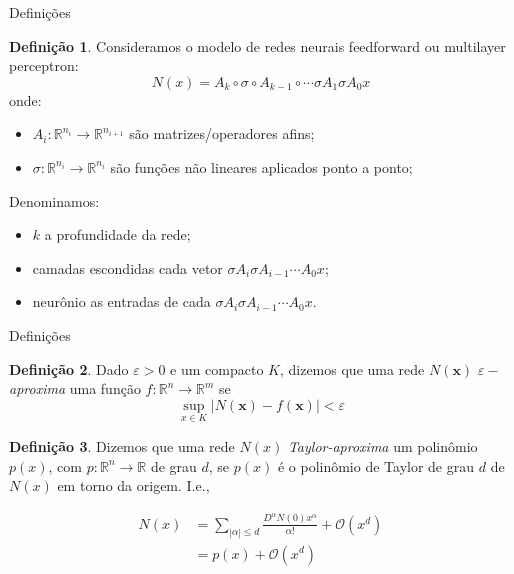 \documentclass{beamer}
\theoremstyle{definition}
\newtheorem{defin}{Definição}[section]
\begin{document}
\begin{frame}{Definições}
    \small

    \begin{defin}
        Consideramos o modelo de redes neurais feedforward ou multilayer perceptron:
        \begin{equation}
            N(x) = A_k \circ \sigma \circ A_{k-1} \circ \cdots \sigma A_1 \sigma A_0 x
        \end{equation}
        onde:
        \begin{itemize}
            \item $A_i:\mathbb R^{n_i} \to \mathbb R^{n_{i+1}}$ são matrizes/operadores afins;
            \item $\sigma:\mathbb R^{n_i} \to \mathbb R^{n_i}$ são funções não lineares aplicados ponto a ponto;
        \end{itemize}
        \pause
        Denominamos:
        \begin{itemize}
            \item $k$ a profundidade da rede; \pause
            \item camadas escondidas cada vetor $\sigma A_i \sigma A_{i-1} \cdots A_0 x$; \pause
            \item neurônio as entradas de cada $\sigma A_i \sigma A_{i-1} \cdots A_0x$.
        \end{itemize}
    \end{defin}
\end{frame}

\begin{frame}{Definições}
    \small

    \begin{defin}
    Dado $\varepsilon>0$ e um compacto $K$, dizemos que uma rede $N(\mathbf x)$ $\varepsilon-$\textit{aproxima} uma função $f:\mathbb R^n \to \mathbb R^m$ se 
    \begin{equation*}
        \sup_{x \in K} |N(\mathbf x) - f(\mathbf x)|< \varepsilon
    \end{equation*}
    \end{defin}

    \pause 

    \begin{defin}
        Dizemos que uma rede $N(x)$ \textit{Taylor-aproxima} um polinômio $p(x)$, com $p:\mathbb R^n \to \mathbb R$ de grau $d$, se $p(x)$ é o polinômio de Taylor de grau $d$ de $N(x)$ em torno da origem. \pause I.e.,

        \begin{align*}
            N(x) &= \sum_{|\alpha| \leq d} \frac{D^{\alpha}N(0)x^\alpha}{\alpha!} + \mathcal O(x^d) \\
            &= p(x) + \mathcal O(x^d)
        \end{align*}
    \end{defin}

\end{frame}
\end{document}
